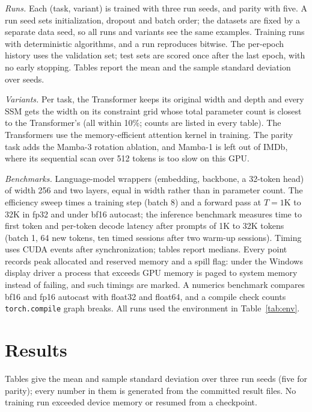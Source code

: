 \documentclass[conference]{IEEEtran}
\newcommand{\mamba}{Mamba}
\begin{document}
\emph{Runs.} Each (task, variant) is trained with three run seeds, and
parity with five. A run seed
sets initialization, dropout and batch order; the datasets are fixed by a
separate data seed, so all runs and variants see the same examples. Training
runs with deterministic algorithms, and a run reproduces bitwise. The
per-epoch history uses the validation set; test sets are scored once after the
last epoch, with no early stopping. Tables report the mean and the sample
standard deviation over seeds.

\emph{Variants.} Per task, the Transformer keeps its original width and depth
and every SSM gets the width on its constraint grid whose total parameter
count is closest to the Transformer's (all within 10\%; counts are listed in
every table). The Transformers use the memory-efficient attention kernel in
training. The parity task adds the \mamba{}-3 rotation ablation, and
\mamba{}-1 is left out of IMDb, where its sequential scan over 512 tokens
is too slow on this GPU.

\emph{Benchmarks.} Language-model wrappers (embedding, backbone, a 32-token
head) of width 256 and two layers, equal in width rather than in parameter
count. The efficiency sweep times a training step
(batch 8) and a forward pass at $T=1$K to 32K in fp32 and under bf16 autocast;
the inference benchmark measures time to first token and per-token decode
latency after prompts of 1K to 32K tokens (batch 1, 64 new tokens, ten timed
sessions after two warm-up sessions). Timing uses CUDA events after
synchronization; tables report medians. Every point records peak allocated and
reserved memory and a spill flag: under the Windows display driver a process
that exceeds GPU memory is paged to system memory instead of failing, and such
timings are marked. A numerics benchmark compares bf16 and fp16 autocast with
float32 and float64, and a compile check counts \texttt{torch.compile} graph
breaks. All runs used the environment in Table~\ref{tab:env}.

\begin{table}[t]
\centering
\caption{Environment of every GPU run.}
\label{tab:env}
\small

\end{table}

\section{Results}
\label{sec:results}
Tables give the mean and sample standard deviation over three run seeds
(five for parity);
every number in them is generated from the committed result files. No
training run exceeded device memory or resumed from a checkpoint.
\end{document}
